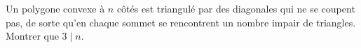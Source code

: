 Un polygone convexe à $n$ côtés est triangulé par des diagonales qui ne se coupent pas, de sorte qu'en chaque sommet se rencontrent un nombre impair de triangles. Montrer que $3 \mid n$.
